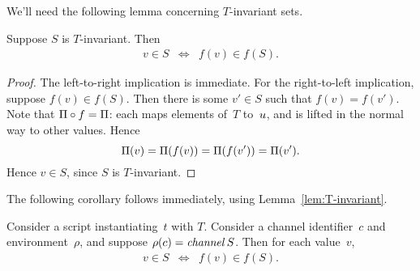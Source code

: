 We'll need the following lemma concerning $T$-invariant sets.
%
\begin{lemma}
\label{lem:T-invariant-inclusion}
Suppose $S$ is $T$-invariant.  Then 
%
\begin{eqnarray*}
v \in S & \iff & f(v) \in f(S).
\end{eqnarray*}
\end{lemma}


\begin{proof}
The left-to-right implication is immediate.  For the right-to-left
implication, suppose $f(v) \in f(S)$.  Then there is some $v' \in S$ such that
$f(v) = f(v')$.  Note that $\Pi \circ f = \Pi$: each maps elements
of~$T$ to~$u$, and is lifted in the normal way to other values.  Hence
\[
\Pi(v) = \Pi(f(v)) = \Pi(f(v')) = \Pi(v').
\]
Hence $v \in S$, since $S$ is $T$-invariant.
\end{proof}


The following corollary follows immediately, using Lemma~\ref{lem:T-invariant}.
%
\begin{corollary}
\label{cor:channel-types}
Consider a script instantiating~$t$ with $T$.  Consider a channel
identifier~$c$ and environment~$\rho$, and suppose $\rho(c) = \mathop{\it channel} S$.
Then for each value~$v$,
\begin{eqnarray*}
v \in S & \iff & f(v) \in f(S).
\end{eqnarray*}
\end{corollary}




